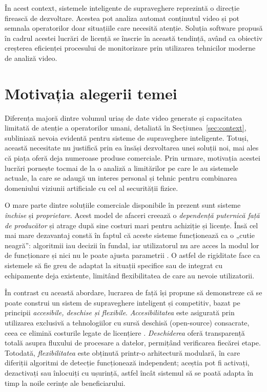 \documentclass[../../main.tex]{subfiles}
\begin{document}
În acest context, sistemele inteligente de supraveghere reprezintă o direcție firească de dezvoltare. Acestea pot analiza automat conținutul video și pot semnala operatorilor doar situațiile care necesită atenție. Soluția software propusă în cadrul acestei lucrări de licență se înscrie în această tendință, având ca obiectiv creșterea eficienței procesului de monitorizare prin utilizarea tehnicilor moderne de analiză video.



\section{Motivația alegerii temei}
\label{sec:motivatie}

Diferența majoră dintre volumul uriaș de date video generate și capacitatea limitată de atenție a operatorilor umani, detaliată în Secțiunea~\ref{sec:context}, subliniază nevoia evidentă pentru sisteme de supraveghere inteligente. Totuși, această necesitate nu justifică prin ea însăși dezvoltarea unei soluții noi, mai ales că piața oferă deja numeroase produse comerciale. Prin urmare, motivația acestei lucrări pornește tocmai de la o analiză a limitărilor pe care le au sistemele actuale, la care se adaugă un interes personal și tehnic pentru combinarea domeniului viziunii artificiale cu cel al securității fizice.

O mare parte dintre soluțiile comerciale disponibile în prezent sunt sisteme \emph{închise} și \emph{proprietare}. Acest model de afaceri creează o \emph{dependență puternică față de producător} și atrage după sine costuri mari pentru achiziție și licențe. Însă cel mai mare dezavantaj constă în faptul că aceste sisteme funcționează ca o „cutie neagră”: algoritmii iau decizii în fundal, iar utilizatorul nu are acces la modul lor de funcționare și nici nu le poate ajusta parametrii \cite{burrell_2016}. O astfel de rigiditate face ca sistemele să fie greu de adaptat la situații specifice sau de integrat cu echipamente deja existente, limitând flexibilitatea de care au nevoie utilizatorii.

În contrast cu această abordare, lucrarea de față își propune să demonstreze că se poate construi un sistem de supraveghere inteligent și competitiv, bazat pe principii \emph{accesibile, deschise și flexibile}. \emph{Accesibilitatea} este asigurată prin utilizarea exclusivă a tehnologiilor cu sursă deschisă (open-source) consacrate, ceea ce elimină costurile legate de licențiere \cite{hoffmann_2024}. \emph{Deschiderea} oferă transparență totală asupra fluxului de procesare a datelor, permițând verificarea fiecărei etape. Totodată, \emph{flexibilitatea} este obținută printr-o arhitectură modulară, în care diferiții algoritmi de detecție funcționează independent; aceștia pot fi activați, dezactivați sau înlocuiți cu ușurință, astfel încât sistemul să se poată adapta în timp la noile cerințe ale beneficiarului.
\end{document}
